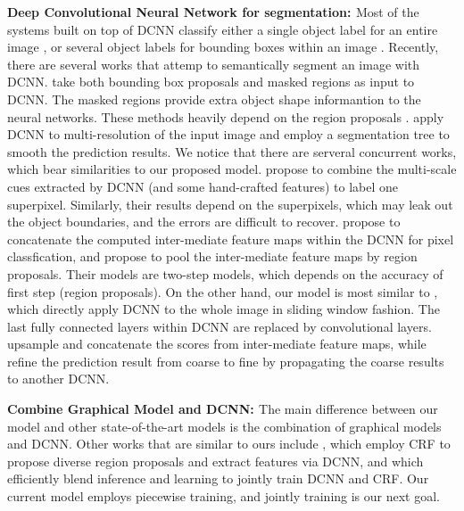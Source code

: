 {\bf{Deep Convolutional Neural Network for segmentation: }} Most of the systems built on top of DCNN classify either a single object label for an entire image \citep{KrizhevskyNIPS2013, simonyan2014very, szegedy2014going}, or several object labels for bounding boxes within an image \citep{papandreou2014untangling, girshick2014rcnn}. Recently, there are several works that attemp to semantically segment an image with DCNN. \citet{girshick2014rcnn, hariharan2014simultaneous} take both bounding box proposals and masked regions as input to DCNN. The masked regions provide extra object shape informantion to the neural networks. These methods heavily depend on the region proposals \citep{arbelaez2014multiscale, Uijlings13}. 
\citet{farabet2013learning} apply DCNN to multi-resolution of the input image and employ a segmentation tree to smooth the prediction results. We notice that there are serveral concurrent works, which bear similarities to our proposed model. \citet{mostajabi2014feedforward} propose to combine the multi-scale cues extracted by DCNN (and some hand-crafted features) to label one superpixel. Similarly, their results depend on the superpixels, which may leak out the object boundaries, and the errors are difficult to recover. \citet{hariharan2014hypercolumns} propose to concatenate the computed inter-mediate feature maps within the DCNN for pixel classfication, and \citet{dai2014convolutional} propose to pool the inter-mediate feature maps by region proposals. Their models are two-step models, which depends on the accuracy of first step (\ie region proposals). On the other hand, our model is most similar to \citet{long2014fully, eigen2014predicting}, which directly apply DCNN to the whole image in sliding window fashion. The last fully connected layers within DCNN are replaced by convolutional layers. \citet{long2014fully} upsample and concatenate the scores from inter-mediate feature maps, while \citet{eigen2014predicting} refine the prediction result from coarse to fine by propagating the coarse results to another DCNN. 

{\bf{Combine Graphical Model and DCNN: }} The main difference between our model and other state-of-the-art models is the combination of graphical models and DCNN. Other works that are similar to ours include \citet{cogswell2014combining}, which employ CRF to propose diverse region proposals \citep{yadollahpour2013discriminative} and extract features via DCNN, and \citet{chen2014learning} which efficiently blend inference and learning to jointly train DCNN and CRF. Our current model employs piecewise training, and jointly training is our next goal.



